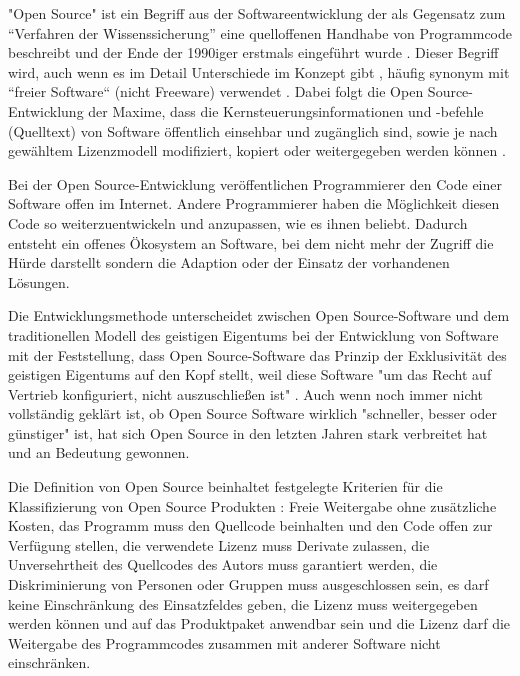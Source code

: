 "Open Source" ist ein Begriff aus der Softwareentwicklung der als Gegensatz zum “Verfahren der Wissenssicherung” \cite{stallman2002} eine quelloffenen Handhabe von Programmcode beschreibt und der Ende der 1990iger erstmals eingeführt wurde  \cite{suchen}. Dieser Begriff wird, auch wenn es im Detail Unterschiede im Konzept gibt \cite{suchen}, häufig synonym mit “freier Software“ (nicht Freeware) verwendet \cite{suchen}. Dabei folgt die Open Source-Entwicklung der Maxime, dass die Kernsteuerungsinformationen und -befehle (Quelltext) von Software öffentlich einsehbar und zugänglich sind, sowie je nach gewähltem Lizenzmodell modifiziert, kopiert oder weitergegeben werden können \cite{suchen}.

Bei der Open Source-Entwicklung veröffentlichen Programmierer den Code einer Software offen im Internet. Andere Programmierer haben die Möglichkeit diesen Code so weiterzuentwickeln und anzupassen, wie es ihnen beliebt. Dadurch entsteht ein offenes Ökosystem an Software, bei dem nicht mehr der Zugriff die Hürde darstellt sondern die Adaption oder der Einsatz der vorhandenen Lösungen.

Die Entwicklungsmethode unterscheidet zwischen Open Source-Software und dem traditionellen Modell des geistigen Eigentums bei der Entwicklung von Software mit der Feststellung, dass Open Source-Software das Prinzip der Exklusivität des geistigen Eigentums auf den Kopf stellt, weil diese Software "um das Recht auf Vertrieb konfiguriert, nicht auszuschließen ist" \cite{suchen}. Auch wenn noch immer nicht vollständig geklärt ist, ob Open Source Software wirklich "schneller, besser oder günstiger" ist, hat sich Open Source in den letzten Jahren stark verbreitet hat \cite{Lerner_2001} und an Bedeutung gewonnen.

Die Definition von Open Source beinhaltet festgelegte Kriterien für die Klassifizierung von Open Source Produkten \cite{suchen}: Freie Weitergabe ohne zusätzliche Kosten, das Programm muss den Quellcode beinhalten und den Code offen zur Verfügung stellen, die verwendete Lizenz muss Derivate zulassen, die Unversehrtheit des Quellcodes des Autors muss garantiert werden, die Diskriminierung von Personen oder Gruppen muss ausgeschlossen sein, es darf keine Einschränkung des Einsatzfeldes geben, die Lizenz muss weitergegeben werden können und auf das Produktpaket anwendbar sein und die Lizenz darf die Weitergabe des Programmcodes zusammen mit anderer Software nicht einschränken.

